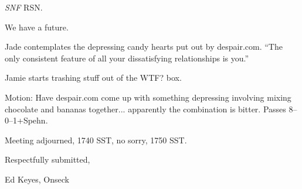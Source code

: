 \documentclass[12pt]{article}
\begin{document}
{\em SNF} RSN.

We have a future.

Jade contemplates the depressing candy hearts put out by despair.com.
``The only consistent feature of all your dissatisfying relationships
is you.''

Jamie starts trashing stuff out of the WTF? box.

Motion: Have despair.com come up with something depressing involving
mixing chocolate and bananas together... apparently the combination is
bitter.  Passes 8--0--1+Spehn.

\vspace{12pt}

\noindent
Meeting adjourned, 1740 SST, no sorry, 1750 SST.

\vspace{18pt}

\centerline{Respectfully submitted,}
\centerline{Ed Keyes, Onseck}
\end{document}
